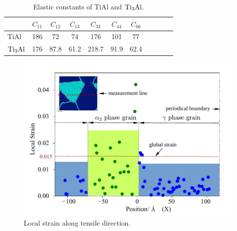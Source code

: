 \documentclass[materials,article,accept,moreauthors,pdftex,10pt,a4paper]{Definitions/mdpi}
\begin{document}
\begin{table}[H]
\caption{Elastic constants of TiAl and $\rm{Ti_3Al}$.}
\centering
\begin{tabular}{l c c c c c c c c c c}
\toprule
\textbf{ } &\boldmath$C_{11}$ &\boldmath$C_{12}$ &\boldmath$C_{13}$ &\boldmath$C_{33}$ &\boldmath$C_{44}$ &\boldmath$C_{66}$\\
\midrule
TiAl \cite{Schwarz1995} &186 &72 &74 & 176 &101 &77	 \\
\midrule
$\rm{Ti_3Al}$ \cite{Tanaka1996}	& 176 &  87.8 & 61.2 & 218.7 & 91.9 & 62.4   \\
\bottomrule
\end{tabular}
\label{tab:elastic}
\end{table}
\unskip
\begin{figure}[H]
\centering
\includegraphics[width=0.75\linewidth]{img/strgrad}
\caption{Local strain along tensile direction.}
\label{fig:strain}
\end{figure}
\unskip
\end{document}
